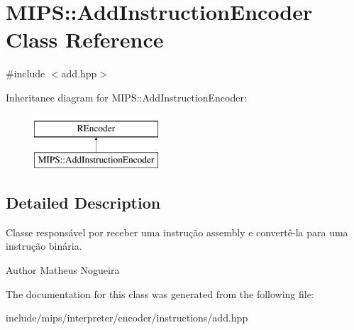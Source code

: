 \hypertarget{classMIPS_1_1AddInstructionEncoder}{}\section{M\+I\+PS\+:\+:Add\+Instruction\+Encoder Class Reference}
\label{classMIPS_1_1AddInstructionEncoder}


{\ttfamily \#include $<$add.\+hpp$>$}

Inheritance diagram for M\+I\+PS\+:\+:Add\+Instruction\+Encoder\+:\begin{figure}[H]
\begin{center}
\leavevmode
\includegraphics[height=2.000000cm]{classMIPS_1_1AddInstructionEncoder}
\end{center}
\end{figure}


\subsection{Detailed Description}
Classe responsável por receber uma instrução assembly e convertê-\/la para uma instrução binária.

\begin{DoxyAuthor}{Author}
Matheus Nogueira 
\end{DoxyAuthor}


The documentation for this class was generated from the following file\+:\begin{DoxyCompactItemize}
\item 
include/mips/interpreter/encoder/instructions/add.\+hpp\end{DoxyCompactItemize}
